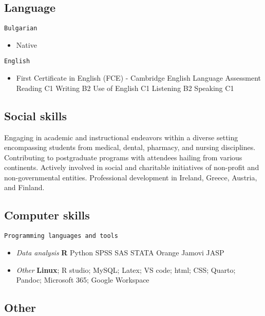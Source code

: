 \documentclass[
  12pt,
  letterpaper,
  DIV=11,
  numbers=noendperiod]{scrartcl}
\providecommand{\tightlist}{%
  \setlength{\itemsep}{0pt}\setlength{\parskip}{0pt}}\usepackage{longtable,booktabs,array}
\begin{document}
\subsection{Language}\label{language}

\texttt{Bulgarian}

\begin{itemize}
\tightlist
\item
  Native
\end{itemize}

\texttt{English}

\begin{itemize}
\tightlist
\item
  First Certificate in English (FCE) - Cambridge English Language
  Assessment \textbar{} Reading C1 \textbar{} Writing B2 \textbar{} Use
  of English C1 \textbar{} Listening B2 \textbar{} Speaking C1
\end{itemize}

\subsection{Social skills}\label{social-skills}

Engaging in academic and instructional endeavors within a diverse
setting encompassing students from medical, dental, pharmacy, and
nursing disciplines. Contributing to postgraduate programs with
attendees hailing from various continents. Actively involved in social
and charitable initiatives of non-profit and non-governmental entities.
Professional development in Ireland, Greece, Austria, and Finland.

\subsection{Computer skills}\label{computer-skills}

\texttt{Programming\ languages\ and\ tools}

\begin{itemize}
\item
  \emph{Data analysis} \textbf{R} \textbar{} Python \textbar{} SPSS
  \textbar{} SAS \textbar{} STATA \textbar{} Orange \textbar{} Jamovi
  \textbar{} JASP
\item
  \emph{Other} \textbf{Linux}; R studio; MySQL; Latex; VS code; html;
  CSS; Quarto; Pandoc; Microsoft 365; Google Workspace
\end{itemize}

\subsection{Other}\label{other}
\end{document}
